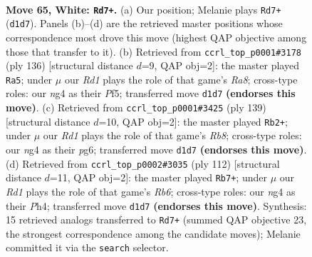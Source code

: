 \documentclass[11pt]{article}
\begin{document}
\clearpage

\begin{figure}[p]\centering
\begin{subfigure}{0.46\textwidth}\centering
\resizebox{\linewidth}{!}{%
\newchessgame
\chessboard[
  setfen={8/7k/1P6/8/P5n1/1K6/7r/3R4 w - - 3 65},
  showmover=false,
  pgfstyle=straightmove, color=movearrow, markmove={d1-d7}
]}
\caption{}
\end{subfigure}\hfill
\begin{subfigure}{0.46\textwidth}\centering
\resizebox{\linewidth}{!}{%
\newchessgame
\chessboard[
  setfen={R7/1r4k1/8/5PK1/8/5P2/8/8 w - - 7 69},
  showmover=false,
  pgfstyle=straightmove, color=movearrow, markmove={a8-a5}
]}
\caption{}
\end{subfigure}
\\[4pt]
\begin{subfigure}{0.46\textwidth}\centering
\resizebox{\linewidth}{!}{%
\newchessgame
\chessboard[
  setfen={7R/8/6P1/8/8/4kp2/7K/1r6 b - - 8 70},
  showmover=false,
  pgfstyle=straightmove, color=movearrow, markmove={b1-b2}
]}
\caption{}
\end{subfigure}\hfill
\begin{subfigure}{0.46\textwidth}\centering
\resizebox{\linewidth}{!}{%
\newchessgame
\chessboard[
  setfen={8/6k1/1R6/5K2/5P1P/8/8/6r1 w - - 7 57},
  showmover=false,
  pgfstyle=straightmove, color=movearrow, markmove={b6-b7}
]}
\caption{}
\end{subfigure}
\caption{\textbf{Move 65, White: \texttt{Rd7+}.} (a) Our position; Melanie plays \texttt{Rd7+} (\texttt{d1d7}). Panels (b)--(d) are the retrieved master positions whose correspondence most drove this move (highest QAP objective among those that transfer to it). (b) Retrieved from \texttt{ccrl\_top\_p0001\#3178} (ply 136) [structural distance $d$=9, QAP obj=2]: the master played \texttt{Ra5}; under $\mu$ our \emph{Rd1} plays the role of that game's \emph{Ra8}; cross-type roles: our \emph{n}g4 as their \emph{P}f5; transferred move \texttt{d1d7} \textbf{(endorses this move)}. (c) Retrieved from \texttt{ccrl\_top\_p0001\#3425} (ply 139) [structural distance $d$=10, QAP obj=2]: the master played \texttt{Rb2+}; under $\mu$ our \emph{Rd1} plays the role of that game's \emph{Rb8}; cross-type roles: our \emph{n}g4 as their \emph{p}g6; transferred move \texttt{d1d7} \textbf{(endorses this move)}. (d) Retrieved from \texttt{ccrl\_top\_p0002\#3035} (ply 112) [structural distance $d$=11, QAP obj=2]: the master played \texttt{Rb7+}; under $\mu$ our \emph{Rd1} plays the role of that game's \emph{Rb6}; cross-type roles: our \emph{n}g4 as their \emph{P}h4; transferred move \texttt{d1d7} \textbf{(endorses this move)}. Synthesis: 15 retrieved analogs transferred to \texttt{Rd7+} (summed QAP objective 23, the strongest correspondence among the candidate moves); Melanie committed it via the \texttt{search} selector.}
\label{fig:thought-m128}
\end{figure}
\end{document}

